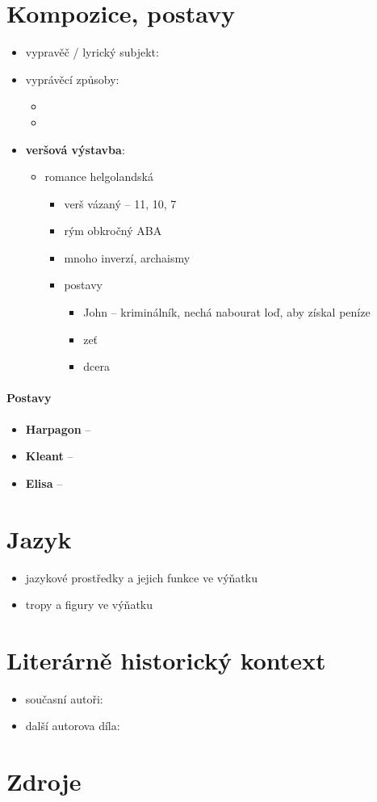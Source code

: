 \documentclass[10pt,a4paper]{article}
\begin{document}
\section*{Kompozice, postavy}
\begin{itemize}
\item vypravěč / lyrický subjekt:
\item vyprávěcí způsoby:
	\begin{itemize}
	\item 
	\item
	\end{itemize}
\item \textbf{veršová výstavba}:	
	\begin{itemize}
	\item romance helgolandská
		\begin{itemize}
		\item verš vázaný -- 11, 10, 7
		\item rým obkročný ABA
		\item mnoho inverzí, archaismy
		\item postavy
			\begin{itemize}
			\item John -- kriminálník, nechá nabourat loď, aby získal peníze
			\item zeť
			\item dcera
			\end{itemize}
		\end{itemize}
		
	\end{itemize}
\end{itemize}

\paragraph{Postavy}
\begin{itemize}
\item \textbf{Harpagon} --
\item \textbf{Kleant} --
\item \textbf{Elisa} --
\end{itemize}
\section*{Jazyk}
\begin{itemize}
\item jazykové prostředky a jejich funkce ve výňatku
\item tropy a figury ve výňatku
\end{itemize}
\section*{Literárně historický kontext}
\begin{itemize}
\item současní autoři:
\item další autorova díla:
\end{itemize}
\section*{Zdroje}
\end{document}
